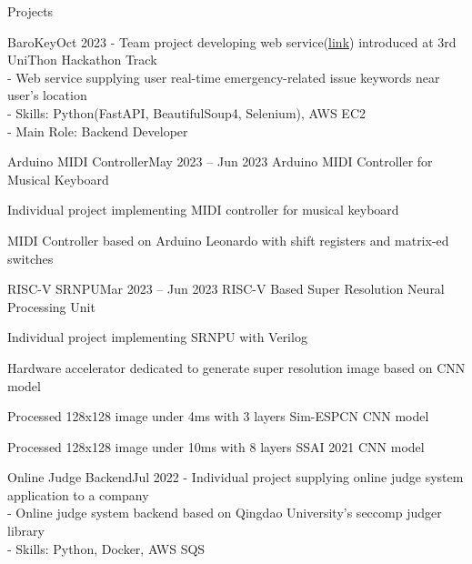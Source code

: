\documentclass{resume}
\begin{document}
\begin{rSection}{Projects}
    \begin{rSubsection}{BaroKey}{Oct 2023}
        - Team project developing web service(\href{https://github.com/UniD3-Hackathon-Team4/barokey}{link}) introduced at 3rd UniThon Hackathon Track \\
        - Web service supplying user real-time emergency-related issue keywords near user's location \\
        - Skills: Python(FastAPI, BeautifulSoup4, Selenium), AWS EC2 \\
        - Main Role: Backend Developer
    \end{rSubsection}

    \begin{rSubsection}{Arduino MIDI Controller}{May 2023 -- Jun 2023}
        Arduino MIDI Controller for Musical Keyboard

        \item Individual project implementing MIDI controller for musical keyboard

        \item MIDI Controller based on Arduino Leonardo with shift registers and matrix-ed switches
    \end{rSubsection}

    \begin{rSubsection}{RISC-V SRNPU}{Mar 2023 -- Jun 2023}
        RISC-V Based Super Resolution Neural Processing Unit

        \item Individual project implementing SRNPU with Verilog

        \item Hardware accelerator dedicated to generate super resolution image based on CNN model

        \item Processed 128x128 image under 4ms with 3 layers Sim-ESPCN CNN model

        \item Processed 128x128 image under 10ms with 8 layers SSAI 2021 CNN model
    \end{rSubsection}

    \begin{rSubsection}{Online Judge Backend}{Jul 2022}
        - Individual project supplying online judge system application to a company \\
        - Online judge system backend based on Qingdao University's seccomp judger library \\
        - Skills: Python, Docker, AWS SQS
    \end{rSubsection}
    
\end{rSection}
\end{document}
